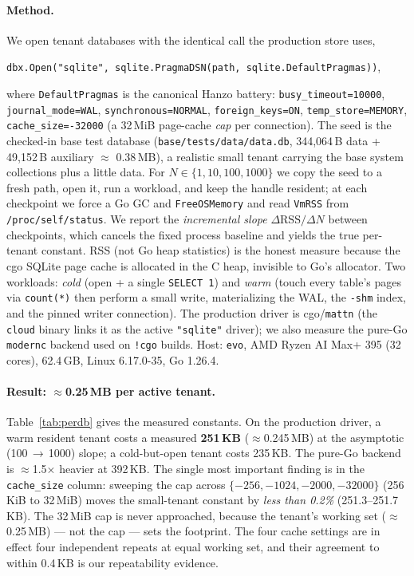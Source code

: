 \documentclass[11pt]{article}
\begin{document}
\paragraph{Method.}
We open tenant databases with the identical call the production store uses,
\begin{center}
\texttt{dbx.Open("sqlite", sqlite.PragmaDSN(path, sqlite.DefaultPragmas))},
\end{center}
where \texttt{DefaultPragmas} is the canonical Hanzo battery: \texttt{busy\_timeout=10000},
\texttt{journal\_mode=WAL}, \texttt{synchronous=NORMAL}, \texttt{foreign\_keys=ON},
\texttt{temp\_store=MEMORY}, \texttt{cache\_size=-32000} (a 32\,MiB page-cache \emph{cap} per
connection). The seed is the checked-in base test database
(\texttt{base/tests/data/data.db}, 344{,}064\,B data + 49{,}152\,B auxiliary $\approx$ 0.38\,MB),
a realistic small tenant carrying the base system collections plus a little data. For
$N \in \{1,10,100,1000\}$ we copy the seed to a fresh path, open it, run a workload, and keep
the handle resident; at each checkpoint we force a Go GC and \texttt{FreeOSMemory} and read
\texttt{VmRSS} from \texttt{/proc/self/status}. We report the \emph{incremental slope}
$\Delta\text{RSS}/\Delta N$ between checkpoints, which cancels the fixed process baseline and
yields the true per-tenant constant. RSS (not Go heap statistics) is the honest measure because
the cgo SQLite page cache is allocated in the C heap, invisible to Go's allocator. Two workloads:
\emph{cold} (open + a single \texttt{SELECT 1}) and \emph{warm} (touch every table's pages via
\texttt{count(*)} then perform a small write, materializing the WAL, the \texttt{-shm} index,
and the pinned writer connection). The production driver is cgo/\texttt{mattn} (the \texttt{cloud}
binary links it as the active \texttt{"sqlite"} driver); we also measure the pure-Go
\texttt{modernc} backend used on \texttt{!cgo} builds. Host: \texttt{evo}, AMD Ryzen AI Max+ 395
(32 cores), 62.4\,GB, Linux 6.17.0-35, Go 1.26.4.

\paragraph{Result: $\approx$0.25\,MB per active tenant.}
Table~\ref{tab:perdb} gives the measured constants. On the production driver, a warm resident
tenant costs a measured \textbf{251\,KB} ($\approx$0.245\,MB) at the asymptotic
(100\,$\rightarrow$\,1000) slope; a cold-but-open tenant costs 235\,KB. The pure-Go backend is
$\approx$1.5$\times$ heavier at 392\,KB. The single most important finding is in the
\texttt{cache\_size} column: sweeping the cap across $\{-256, -1024, -2000, -32000\}$
(256\,KiB to 32\,MiB) moves the small-tenant constant by \emph{less than 0.2\%}
(251.3--251.7\,KB). The 32\,MiB cap is never approached, because the tenant's working set
($\approx$0.25\,MB) --- not the cap --- sets the footprint. The four cache settings are in effect
four independent repeats at equal working set, and their agreement to within 0.4\,KB is our
repeatability evidence.
\end{document}
